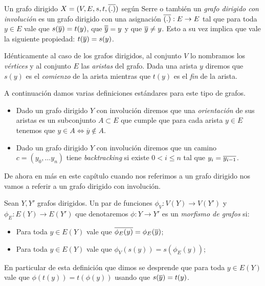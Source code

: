 \documentclass[tesis.tex]{subfiles}
\begin{document}
\begin{deff}
	Un grafo dirigido $X = (V,E,s,t,\overline{(.)})$ según Serre o también un \emph{grafo dirigido con involución} 
	es un grafo dirigido con una asignación $\overline{(.)}:E \to E$ tal que para toda $y \in E$ vale que $s(\overline{y}) = t(y)$, que $\overline{\overline y} = y$ y que $\overline{y} \neq y$.
	Esto a su vez implica que vale la siguiente propiedad: $t(\overline y) = s(y)$.

	Idénticamente al caso de los grafos dirigidos, 
	al conjunto $V$ lo nombramos los \emph{vértices} y al conjunto $E$ las \emph{aristas} del grafo.
	Dada una arista $y$ diremos que $s(y)$ es el \emph{comienzo} de la arista mientras que $t(y)$ es el \emph{fin} de la arista.
	
	
	A continuación damos varias definiciones estándares para este tipo de grafos.

	\begin{itemize}
		\item Dado un grafo dirigido $Y$ con involución diremos que una 
		\emph{orientación} de sus aristas es un subconjunto $A \subset E$ que cumple que para cada arista $y \in E$ tenemos que $y \in A \iff \overline y \notin A$.	

		\item Dado un grafo dirigido $Y$ con involución diremos que un camino $c= (y_0, \dots y_n)$ tiene \emph{backtracking} si existe $ 0 < i \le n$ tal que $y_i = \overline{y_{i-1}}$.	
	\end{itemize}
\end{deff}	

De ahora en más en este capítulo cuando nos referimos a un grafo dirigido nos vamos a referir a un grafo dirigido con involución.

\begin{deff}
	Sean $Y, Y'$ grafos dirigidos. 
	Un par de funciones $\phi_V:V(Y) \to V(Y')$ y $\phi_E: E(Y) \to E(Y')$ que denotaremos $\phi:Y \to Y'$ es un \emph{morfismo de grafos} si:
	\begin{itemize}
		\item Para toda $y \in E(Y)$ vale que $\overline{\phi_{E}(y)} = \phi_{E}(\overline y)$;
		\item Para toda $y \in E(Y)$ vale que $\phi_{V}(s(y)) = s(\phi_{E}(y))$;
	\end{itemize}   
	En particular de esta definición que dimos se desprende que para toda $y \in E(Y)$ vale que $\phi(t(y)) = t(\phi(y))$ usando que $s(\overline y) = t(y)$.
\end{deff}
\end{document}
